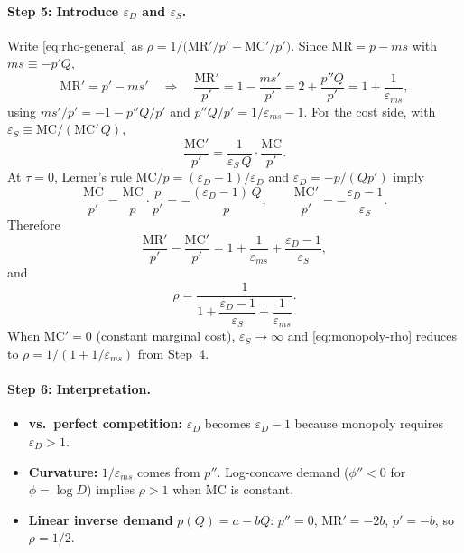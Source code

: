 \documentclass[11pt]{article}
\begin{document}
\paragraph{Step 5: Introduce $\varepsilon_D$ and $\varepsilon_S$.}
Write \eqref{eq:rho-general} as
$\rho = 1/\bigl(\mathrm{MR}'/p' - \mathrm{MC}'/p'\bigr)$.
Since $\mathrm{MR} = p - ms$ with $ms \equiv -p'Q$,
\[
  \mathrm{MR}' = p' - ms'
  \quad\Rightarrow\quad
  \frac{\mathrm{MR}'}{p'}
  = 1 - \frac{ms'}{p'}
  = 2 + \frac{p''Q}{p'}
  = 1 + \frac{1}{\varepsilon_{ms}},
\]
using $ms'/p' = -1 - p''Q/p'$ and $p''Q/p' = 1/\varepsilon_{ms} - 1$.
For the cost side, with $\varepsilon_S \equiv \mathrm{MC}/(\mathrm{MC}'\,Q)$,
\[
  \frac{\mathrm{MC}'}{p'}
  = \frac{1}{\varepsilon_S\,Q}\cdot\frac{\mathrm{MC}}{p'}.
\]
At $\tau = 0$, Lerner's rule $\mathrm{MC}/p = (\varepsilon_D-1)/\varepsilon_D$ and
$\varepsilon_D = -p/(Q p')$ imply
\[
  \frac{\mathrm{MC}}{p'}
  = \frac{\mathrm{MC}}{p}\cdot\frac{p}{p'}
  = -\frac{(\varepsilon_D - 1)\,Q}{p},
  \qquad
  \frac{\mathrm{MC}'}{p'} = -\frac{\varepsilon_D - 1}{\varepsilon_S}.
\]
Therefore
\[
  \frac{\mathrm{MR}'}{p'} - \frac{\mathrm{MC}'}{p'}
  = 1 + \frac{1}{\varepsilon_{ms}} + \frac{\varepsilon_D - 1}{\varepsilon_S},
\]
and
\begin{equation}
  \rho = \frac{1}{1 + \dfrac{\varepsilon_D - 1}{\varepsilon_S}
    + \dfrac{1}{\varepsilon_{ms}}}.
  \label{eq:monopoly-rho}
\end{equation}
When $\mathrm{MC}' = 0$ (constant marginal cost), $\varepsilon_S \to \infty$ and
\eqref{eq:monopoly-rho} reduces to $\rho = 1/(1 + 1/\varepsilon_{ms})$ from
Step~4.

\paragraph{Step 6: Interpretation.}
\begin{itemize}
  \item \textbf{vs.\ perfect competition:} $\varepsilon_D$ becomes
    $\varepsilon_D - 1$ because monopoly requires $\varepsilon_D > 1$.
  \item \textbf{Curvature:} $1/\varepsilon_{ms}$ comes from $p''$.
    Log-concave demand ($\phi'' < 0$ for $\phi = \log D$) implies
    $\rho > 1$ when $\mathrm{MC}$ is constant.
  \item \textbf{Linear inverse demand} $p(Q) = a - bQ$: $p'' = 0$,
    $\mathrm{MR}' = -2b$, $p' = -b$, so $\rho = 1/2$.
\end{itemize}

\end{document}
